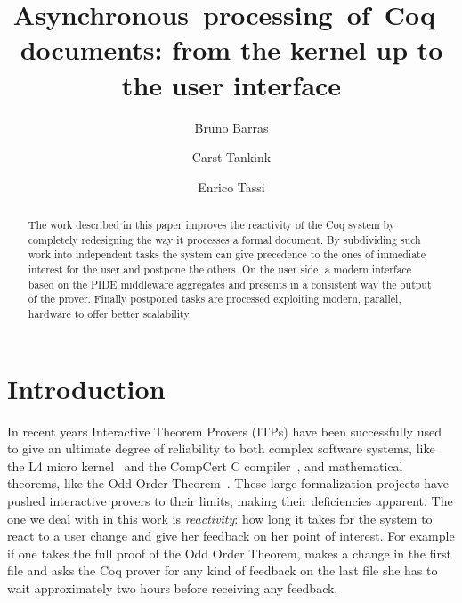 \documentclass[runningheads,a4paper,oribibl]{llncs}
\begin{document}
\title{Asynchronous~processing~of~Coq~documents: from the kernel up to the user interface}

\author{ 
	 Bruno Barras
	 \and
         Carst Tankink 
	 \and 
	 Enrico Tassi
}


\maketitle

\begin{abstract}
  The work described in this paper improves the reactivity of the Coq
  system by completely redesigning the way it processes a formal
  document.  By subdividing such work into independent
  tasks the system can give precedence to the ones of immediate
  interest for the user and postpone the others.  On the user side, a
  modern interface based on the PIDE middleware aggregates and
  presents in a consistent way the output of the prover.  Finally
  postponed tasks are processed exploiting modern, parallel,
  hardware to offer better scalability.
\end{abstract}

\section{Introduction}

In recent years Interactive Theorem Provers (ITPs) have been
successfully used to give an ultimate degree of reliability to both
complex software systems, like the L4 micro
kernel~\cite{Klein:2010:SFV:1743546.1743574} and the CompCert C
compiler~\cite{Leroy-Compcert-CACM}, and mathematical theorems, like
the Odd Order Theorem~{\cite{gonthier:hal-00816699}}.  These large
formalization projects have pushed interactive provers to their
limits, making their deficiencies apparent.
The one we deal with in this work is {\emph{reactivity}}: how long it
takes for the system to react to a user change and give her feedback on
her point of interest. For example if one takes the full proof of the
Odd Order Theorem, makes a change in the first file and asks the
Coq prover for any kind of feedback on the last file she has to wait
approximately two hours before receiving any feedback. 
\end{document}
